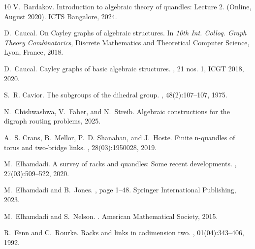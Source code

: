 \documentclass{jonasart}
\begin{document}
    {\footnotesize
    \begin{thebibliography}{10}    
        V.~Bardakov.
        \newblock Introduction to algebraic theory of quandles: Lecture 2.
         (Online, August 2020).
        \newblock ICTS Bangalore, 2024.
        
        D.~Caucal.
        \newblock On {C}ayley graphs of algebraic structures.
        \newblock In {\em {10th Int. Colloq. Graph Theory Combinatorics}}, Discrete
        Mathematics and Theoretical Computer Science, Lyon, France, 2018.
        
        D.~Caucal.
        \newblock Cayley graphs of basic algebraic structures.
        , 21 nos.
        1, ICGT 2018, 2020.
        
        S.~R. Cavior.
        \newblock The subgroups of the dihedral group.
        , 48(2):107–107, 1975.
        
        N.~Chishwashwa, V.~Faber, and N.~Streib.
        \newblock Algebraic constructions for the digraph routing problems, 2025.
        
        A.~S. Crans, B.~Mellor, P.~D. Shanahan, and J.~Hoste.
        \newblock Finite n-quandles of torus and two-bridge links.
        , 28(03):1950028,
        2019.
        
        M.~Elhamdadi.
        \newblock A survey of racks and quandles: Some recent developments.
        , 27(03):509–522, 2020.
        
        M.~Elhamdadi and B.~Jones.
        , page 1–48.
        \newblock Springer International Publishing, 2023.
        
        M.~Elhamdadi and S.~Nelson.
        .
        \newblock American Mathematical Society, 2015.
        
        R.~Fenn and C.~Rourke.
        \newblock Racks and links in codimension two.
        , 01(04):343–406,
        1992.
        

\end{thebibliography}}
\end{document}
